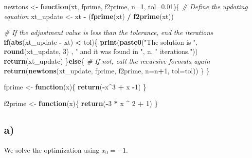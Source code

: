 \documentclass[]{article}
\newenvironment{Shaded}{\begin{snugshade}}{\end{snugshade}}
\newcommand{\KeywordTok}[1]{\textcolor[rgb]{0.13,0.29,0.53}{\textbf{#1}}}
\newcommand{\DataTypeTok}[1]{\textcolor[rgb]{0.13,0.29,0.53}{#1}}
\newcommand{\DecValTok}[1]{\textcolor[rgb]{0.00,0.00,0.81}{#1}}
\newcommand{\FloatTok}[1]{\textcolor[rgb]{0.00,0.00,0.81}{#1}}
\newcommand{\StringTok}[1]{\textcolor[rgb]{0.31,0.60,0.02}{#1}}
\newcommand{\CommentTok}[1]{\textcolor[rgb]{0.56,0.35,0.01}{\textit{#1}}}
\newcommand{\ControlFlowTok}[1]{\textcolor[rgb]{0.13,0.29,0.53}{\textbf{#1}}}
\newcommand{\OperatorTok}[1]{\textcolor[rgb]{0.81,0.36,0.00}{\textbf{#1}}}
\newcommand{\NormalTok}[1]{#1}
\begin{document}
\begin{Shaded}
\begin{Highlighting}[]
\NormalTok{newtons <-}\StringTok{ }\ControlFlowTok{function}\NormalTok{(xt, fprime, f2prime, }\DataTypeTok{n=}\DecValTok{1}\NormalTok{, }\DataTypeTok{tol=}\FloatTok{0.01}\NormalTok{)\{}
  \CommentTok{# Define the updating equation}
\NormalTok{  xt_update <-}\StringTok{ }\NormalTok{xt }\OperatorTok{-}\StringTok{ }\NormalTok{(}\KeywordTok{fprime}\NormalTok{(xt) }\OperatorTok{/}\StringTok{ }\KeywordTok{f2prime}\NormalTok{(xt))}
  
  \CommentTok{# If the adjustment value is less than the tolerance, end the iterations}
  \ControlFlowTok{if}\NormalTok{(}\KeywordTok{abs}\NormalTok{(xt_update }\OperatorTok{-}\StringTok{ }\NormalTok{xt) }\OperatorTok{<}\StringTok{ }\NormalTok{tol)\{}
    \KeywordTok{print}\NormalTok{(}\KeywordTok{paste0}\NormalTok{(}\StringTok{"The solution is "}\NormalTok{, }\KeywordTok{round}\NormalTok{(xt_update, }\DecValTok{3}\NormalTok{) , }\StringTok{" and it was found in "}\NormalTok{, n, }\StringTok{" iterations."}\NormalTok{))}
    \KeywordTok{return}\NormalTok{(xt_update)}
\NormalTok{  \}}\ControlFlowTok{else}\NormalTok{\{}
    \CommentTok{# If not, call the recursive formula again}
    \KeywordTok{return}\NormalTok{(}\KeywordTok{newtons}\NormalTok{(xt_update, fprime, f2prime, }\DataTypeTok{n=}\NormalTok{n}\OperatorTok{+}\DecValTok{1}\NormalTok{, }\DataTypeTok{tol=}\NormalTok{tol))}
\NormalTok{  \}}
\NormalTok{\}}

\NormalTok{fprime <-}\StringTok{ }\ControlFlowTok{function}\NormalTok{(x)\{}
  \KeywordTok{return}\NormalTok{(}\OperatorTok{-}\NormalTok{x}\OperatorTok{^}\DecValTok{3} \OperatorTok{+}\StringTok{ }\NormalTok{x }\OperatorTok{-}\DecValTok{1}\NormalTok{)}
\NormalTok{\}}

\NormalTok{f2prime <-}\StringTok{ }\ControlFlowTok{function}\NormalTok{(x)\{}
  \KeywordTok{return}\NormalTok{(}\OperatorTok{-}\DecValTok{3} \OperatorTok{*}\StringTok{ }\NormalTok{x }\OperatorTok{^}\StringTok{ }\DecValTok{2} \OperatorTok{+}\StringTok{ }\DecValTok{1}\NormalTok{)}
\NormalTok{\}}
\end{Highlighting}
\end{Shaded}

\subsection{a)}\label{a-1}

We solve the optimization using \(x_0=-1\).
\end{document}
